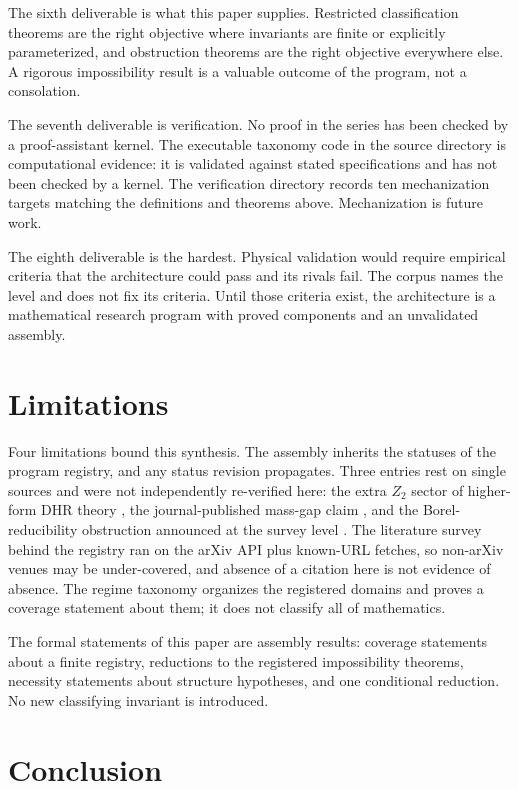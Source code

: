 \documentclass[11pt,letterpaper]{article}
\theoremstyle{definition}
\begin{document}
The sixth deliverable is what this paper supplies. Restricted classification theorems are the right objective where invariants are finite or explicitly parameterized, and obstruction theorems are the right objective everywhere else. A rigorous impossibility result is a valuable outcome of the program, not a consolation.

The seventh deliverable is verification. No proof in the series has been checked by a proof-assistant kernel. The executable taxonomy code in the source directory is computational evidence: it is validated against stated specifications and has not been checked by a kernel. The verification directory records ten mechanization targets matching the definitions and theorems above. Mechanization is future work.

The eighth deliverable is the hardest. Physical validation would require empirical criteria that the architecture could pass and its rivals fail. The corpus names the level and does not fix its criteria. Until those criteria exist, the architecture is a mathematical research program with proved components and an unvalidated assembly.

\section{Limitations}
\label{sec:limitations}

Four limitations bound this synthesis. The assembly inherits the statuses of the program registry, and any status revision propagates. Three entries rest on single sources and were not independently re-verified here: the extra $Z_2$ sector of higher-form DHR theory \cite{corpus-20}, the journal-published mass-gap claim \cite{corpus-28}, and the Borel-reducibility obstruction announced at the survey level \cite{corpus-59}. The literature survey behind the registry ran on the arXiv API plus known-URL fetches, so non-arXiv venues may be under-covered, and absence of a citation here is not evidence of absence. The regime taxonomy organizes the registered domains and proves a coverage statement about them; it does not classify all of mathematics.

The formal statements of this paper are assembly results: coverage statements about a finite registry, reductions to the registered impossibility theorems, necessity statements about structure hypotheses, and one conditional reduction. No new classifying invariant is introduced.

\section{Conclusion}
\end{document}
